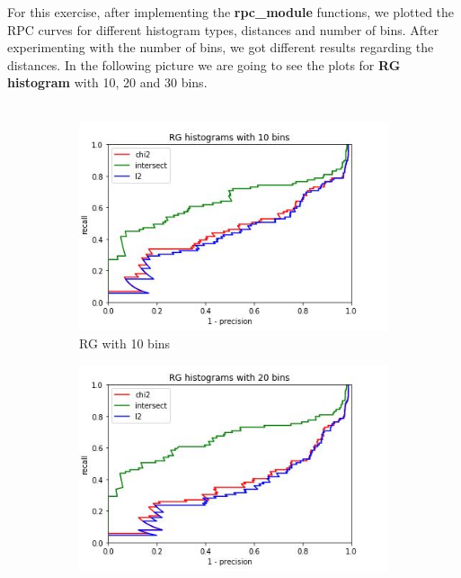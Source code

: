 \documentclass[
	12pt, %
]{fphw}
\begin{document}
For this exercise, after implementing the \textbf{rpc\_module} functions, we plotted the RPC curves for different histogram types, distances and number of bins. After experimenting with the number of bins, we got different results regarding the distances. In the following picture we are going to see the plots for \textbf{RG histogram} with 10, 20 and 30 bins.\\ \\
\begin{figure}[h!]
     \centering
     \begin{subfigure}[b]{0.3\textwidth}
         \centering
         \includegraphics[width=\textwidth]{img/plots/RG_10.JPG}
         \caption{RG with 10 bins}
         \label{fig:y equals x}
     \end{subfigure}
     \hfill
     \begin{subfigure}[b]{0.3\textwidth}
         \centering
         \includegraphics[width=\textwidth]{img/plots/RG_20.JPG}

\end{subfigure}
\end{figure}
\end{document}
